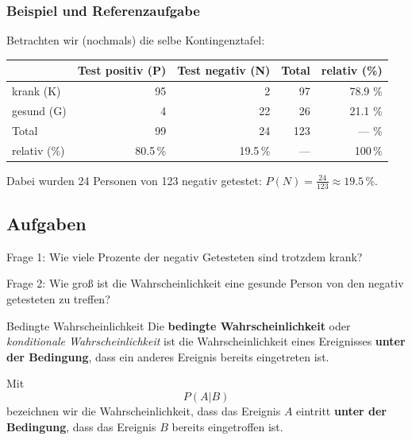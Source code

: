 \newpage

\subsubsection{Beispiel und Referenzaufgabe}
Betrachten wir (nochmals) die selbe Kontingenztafel:

  \begin{tabular}{|l|r|r|r|r|}\hline
                 & Test positiv (P) & Test negativ (N)& Total & relativ (\%) \\\hline
    krank (K)    & 95               & 2               & 97    & 78.9 \%      \\\hline    
    gesund (G)   & 4                & 22              & 26    & 21.1 \%      \\\hline
    Total        & 99               & 24              & 123   &  --- \%      \\\hline
    relativ (\%) & 80.5\,\%           &19.5\,\%           & ---   &   100\,\%      \\\hline
  \end{tabular}

  
Dabei wurden 24 Personen von 123 negativ getestet: $P(N) =\frac{24}{123}\approx 19.5\,\%$.


\subsection*{Aufgaben}

Frage 1: Wie viele Prozente der negativ Getesteten sind trotzdem krank?



Frage 2: 
Wie groß ist die Wahrscheinlichkeit eine gesunde Person von den negativ getesteten zu treffen?



\newpage





\begin{definition}{Bedingte Wahrscheinlichkeit}{}
Die \textbf{bedingte Wahrscheinlichkeit} oder \textit{konditionale
  Wahrscheinlichkeit} ist die Wahrscheinlichkeit eines Ereignisses
\textbf{unter der Bedingung}, dass ein anderes Ereignis bereits
eingetreten ist.

  Mit
  $$P(A | B)$$
  bezeichnen wir die Wahrscheinlichkeit, dass das Ereignis $A$
  eintritt \textbf{unter der Bedingung}, dass das Ereignis $B$ bereits
  eingetroffen ist.
\end{definition}

